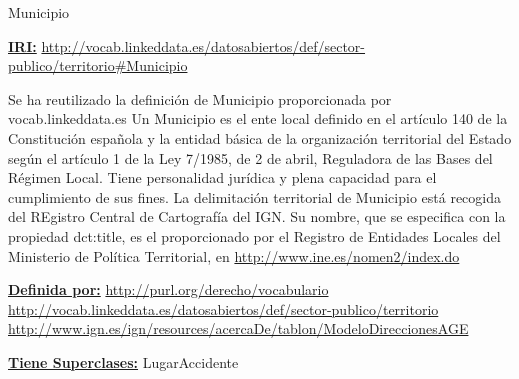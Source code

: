 \begin{mybox}{Municipio}
\begin{flushleft}
\underline{\textbf{IRI:}}
\url{http://vocab.linkeddata.es/datosabiertos/def/sector-publico/territorio#Municipio}
\newline

Se ha reutilizado la definición de Municipio proporcionada por vocab.linkeddata.es \cite{datoabiertos_municipio}
Un Municipio es el ente local definido en el artículo 140 de la Constitución española y la entidad básica de la organización territorial del Estado según el artículo 1 de la Ley 7/1985, de 2 de abril, Reguladora de las Bases del Régimen Local. Tiene personalidad jurídica y plena capacidad para el cumplimiento de sus fines. La delimitación territorial de Municipio está recogida del REgistro Central de Cartografía del IGN. Su nombre, que se especifica con la propiedad dct:title, es el proporcionado por el Registro de Entidades Locales del Ministerio de Política Territorial, en \url{http://www.ine.es/nomen2/index.do}
\newline


\underline{\textbf{Definida por:}}
\url{http://purl.org/derecho/vocabulario}
\url{http://vocab.linkeddata.es/datosabiertos/def/sector-publico/territorio}
\url{http://www.ign.es/ign/resources/acercaDe/tablon/ModeloDireccionesAGE}
\newline

\underline{\textbf{Tiene Superclases:}}
\newline LugarAccidente



\end{flushleft}
\end{mybox}




